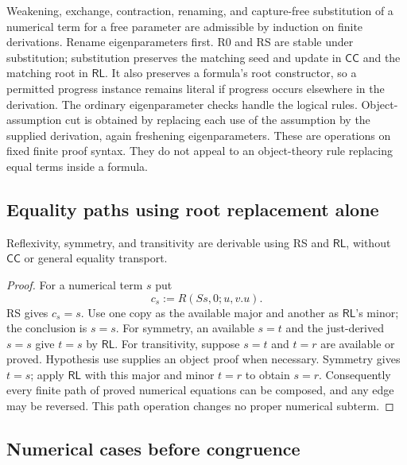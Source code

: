 Weakening, exchange, contraction, renaming, and capture-free substitution
of a numerical term for a free parameter are admissible by induction on
finite derivations. Rename eigenparameters first. R0 and RS are stable
under substitution; substitution preserves the matching seed and update
in $\mathsf{CC}$ and the matching root in $\mathsf{RL}$. It also
preserves a formula's root constructor, so a permitted progress instance
remains literal if progress occurs elsewhere in the derivation.
The ordinary eigenparameter checks handle the logical rules.
Object-assumption cut is obtained by replacing each use of the assumption
by the supplied derivation, again freshening eigenparameters.
These are operations on fixed finite proof syntax. They do not appeal
to an object-theory rule replacing equal terms inside a formula.

\subsection{Equality paths using root replacement alone}

\begin{lemma}
\label{ctr:equality-algebra}
Reflexivity, symmetry, and transitivity are derivable using RS and
$\mathsf{RL}$, without $\mathsf{CC}$ or general equality transport.
\end{lemma}
\begin{proof}
For a numerical term $s$ put
\[
             c_s:=R(Ss,0;u,v.u).
\]
RS gives $c_s=s$. Use one copy as the available major and another as
$\mathsf{RL}$'s minor; the conclusion is $s=s$.
For symmetry, an available $s=t$ and the just-derived $s=s$ give
$t=s$ by $\mathsf{RL}$.
For transitivity, suppose $s=t$ and $t=r$ are available or proved.
Hypothesis use supplies an object proof when necessary. Symmetry gives
$t=s$; apply $\mathsf{RL}$ with this major and minor $t=r$ to obtain
$s=r$. Consequently every finite path of proved numerical equations
can be composed, and any edge may be reversed. This path operation
changes no proper numerical subterm.
\end{proof}

\subsection{Numerical cases before congruence}

